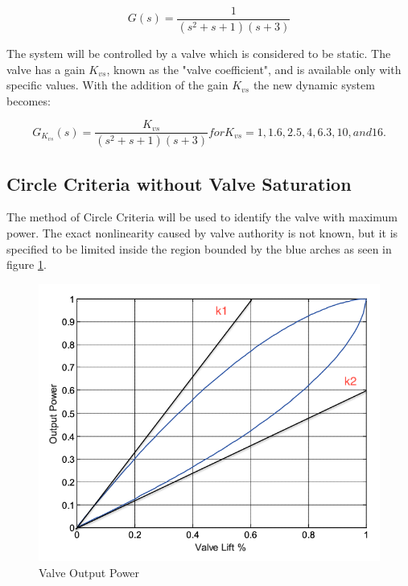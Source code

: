 \documentclass[a4paper, titlepage]{article}
\begin{document}
\begin{equation}
	G(s) = \frac{1}{(s^2+s+1)(s+3)}
	\label{equ:system}
\end{equation}

The system will be controlled by a valve which is considered to be static.  The valve has a gain $K_{vs}$, known as the "valve coefficient", and is available only with specific values.
With the addition of the gain $K_{vs}$ the new dynamic system becomes:

\begin{equation}
	G_{K_{vs}}(s) = \frac{K_{vs}}{(s^2+s+1)(s+3)} for K_{vs}=1, 1.6, 2.5, 4, 6.3, 10, and 16.
	\label{equ:systemTF}
\end{equation}


\subsection{Circle Criteria without Valve Saturation}

The method of Circle Criteria will be used to identify the valve with maximum power.  The exact nonlinearity caused by valve authority is not known, but it is specified to be limited inside the region bounded by the blue arches as seen in figure \ref{fig:valvepower}.

\begin{figure}[h!]
\center
\includegraphics[scale=0.25]{../figures/valveOutputPower.png}
\caption{Valve Output Power}
\label{fig:valvepower}
\end{figure}
\end{document}
